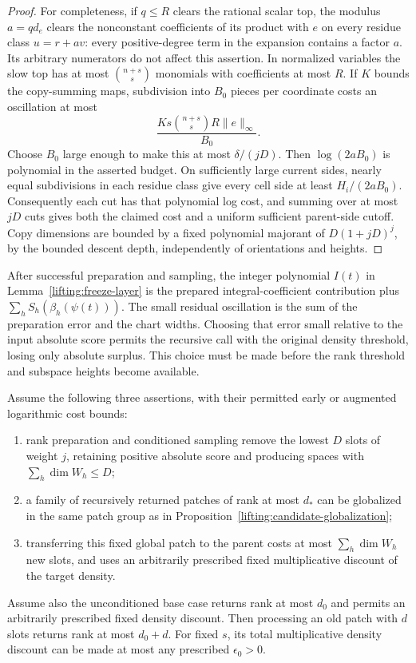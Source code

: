 \begin{proof}
For completeness, if $q\le R$ clears the rational scalar top, the
modulus $a=qd_e$ clears the nonconstant coefficients of its product
with $e$ on every residue class $u=r+av$: every positive-degree
term in the expansion contains a factor $a$.  Its arbitrary
numerators do not affect this assertion.  In normalized variables
the slow top has at most $\binom{n+s}{s}$ monomials with coefficients
at most $R$.  If $K$ bounds the copy-summing maps, subdivision into
$B_0$ pieces per coordinate costs an oscillation at most
\[
 \frac{Ks\binom{n+s}{s}R\|e\|_\infty}{B_0}.
\]
Choose $B_0$ large enough to make this at most $\delta/(jD)$.
Then $\log(2aB_0)$ is polynomial in the asserted budget.  On
sufficiently large current sides, nearly equal subdivisions in
each residue class give every cell side at least $H_i/(2aB_0)$.
Consequently each cut has that polynomial log cost, and summing
over at most $jD$ cuts gives both the claimed cost and a uniform
sufficient parent-side cutoff.  Copy dimensions are bounded by a
fixed polynomial majorant of $D(1+jD)^j$, by the bounded descent
depth, independently of orientations and heights.
\end{proof}

After successful preparation and sampling, the integer polynomial
$I(t)$ in Lemma~\ref{lifting:freeze-layer} is the prepared
integral-coefficient contribution plus
$\sum_h S_h(\beta_h(\psi(t)))$.  The small residual oscillation is the sum of the
preparation error and the chart widths.  Choosing that error small
relative to the input absolute score permits the recursive call with
the original density threshold, losing only absolute surplus.
This choice must be made before the rank threshold and subspace
heights become available.

\begin{proposition}
\label{lifting:linear-rank}
Assume the following three assertions, with their permitted
early or augmented logarithmic cost bounds:
\begin{enumerate}
\item rank preparation and conditioned sampling remove the lowest
      $D$ slots of weight $j$, retaining positive absolute score and
      producing spaces with $\sum_h\dim W_h\le D$;
\item a family of recursively returned patches of rank at most $d_*$
      can be globalized in the same patch group as in
      Proposition~\ref{lifting:candidate-globalization};
\item transferring this fixed global patch to the parent costs at
      most $\sum_h\dim W_h$ new slots, and uses an arbitrarily
      prescribed fixed multiplicative discount of the target density.
\end{enumerate}
Assume also the unconditioned base case returns rank at most $d_0$
and permits an arbitrarily prescribed fixed density discount.
Then processing an old patch with $d$ slots returns rank at most
$d_0+d$.  For fixed $s$, its total multiplicative density discount
can be made at most any prescribed $\epsilon_0>0$.
\end{proposition}


